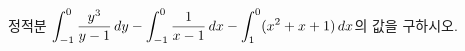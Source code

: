 정적분 $\displaystyle\int_{-1}^{0}\dfrac{y^3}{y-1}\mkern3mu dy-\int_{-1}^{0}\dfrac{1}{x-1}\mkern3mu dx-\int_{1}^{0}(x^2+x+1)\mkern3mu dx$의 값을 구하시오.
